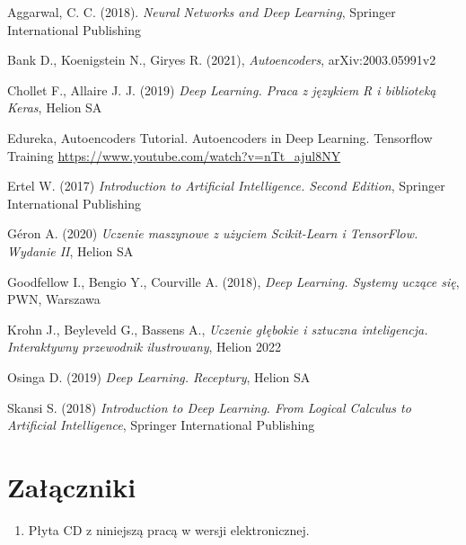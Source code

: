 \documentclass[12pt]{mwbk}
\theoremstyle{plain}
\theoremstyle{definition}
\theoremstyle{remark}
\begin{document}
\begin{thebibliography}{99}

 Aggarwal, C. C. (2018).\emph{ Neural Networks and Deep Learning}, Springer International Publishing

 Bank D., Koenigstein N., Giryes R. (2021), \emph{Autoencoders}, arXiv:2003.05991v2

 Chollet F., Allaire J. J. (2019) \emph{Deep Learning. Praca z językiem R i biblioteką Keras}, Helion SA

 Edureka, Autoencoders Tutorial. Autoencoders in Deep Learning. Tensorflow Training \url{https://www.youtube.com/watch?v=nTt_ajul8NY} 

 Ertel W. (2017) \emph{Introduction to Artificial Intelligence. Second Edition}, Springer International Publishing

 G\'eron A. (2020) \emph{Uczenie maszynowe z użyciem Scikit-Learn i TensorFlow. Wydanie II}, Helion SA

 Goodfellow I., Bengio Y., Courville A. (2018), \emph{Deep Learning. Systemy uczące się}, PWN, Warszawa 

 Krohn J., Beyleveld G., Bassens A., \emph{Uczenie głębokie i sztuczna inteligencja. Interaktywny przewodnik ilustrowany}, Helion 2022

 Osinga D. (2019) \emph{Deep Learning. Receptury}, Helion SA

 Skansi S. (2018) \emph{Introduction to Deep Learning. From Logical Calculus to Artificial Intelligence}, Springer International Publishing


\end{thebibliography}



\listoffigures

\listoftables


\chapter*{Załączniki}
\begin{enumerate}
\item Płyta CD z niniejszą pracą w wersji elektronicznej.
\end{enumerate}
\end{document}

